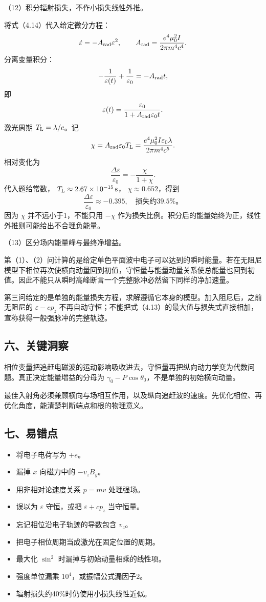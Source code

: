 \documentclass[12pt,a4paper,fontset=fandol]{ctexart}
\providecommand{\tightlist}{\setlength{\itemsep}{0pt}\setlength{\parskip}{0pt}}
\begin{document}
（12）积分辐射损失，不作小损失线性外推。

将式（4.14）代入给定微分方程： \[
\dot\varepsilon=-A_{\rm rad}\varepsilon^2,\qquad
A_{\rm rad}=\frac{e^4\mu_0^2I}{2\pi m^4c^4}.
\] 分离变量积分： \[
-\frac1{\varepsilon(t)}+\frac1{\varepsilon_0}
=-A_{\rm rad}t,
\] 即 \[
\varepsilon(t)=\frac{\varepsilon_0}
{1+A_{\rm rad}\varepsilon_0t}.
\] 激光周期 \(T_{\rm L}=\lambda/c\)。记 \[
\chi=A_{\rm rad}\varepsilon_0T_{\rm L}
=\frac{e^4\mu_0^2I\varepsilon_0\lambda}
{2\pi m^4c^5}.
\] 相对变化为 \[
\boxed{\frac{\Delta\varepsilon}{\varepsilon_0}
=-\frac{\chi}{1+\chi}.}\tag{4.15}
\] 代入题给常数， \(T_{\rm L}\approx2.67\times10^{-15}\,\mathrm s\)，
\(\chi\approx0.652\)，得到 \[
\boxed{\frac{\Delta\varepsilon}{\varepsilon_0}
\approx-0.395,\quad\text{损失约39.5\%。}}
\] 因为 \(\chi\) 并不远小于1，不能只用 \(-\chi\)
作为损失比例。积分后的能量始终为正，线性外推则可能给出不合理负能量。

（13）区分场内能量峰与最终净增益。

第（1）、（2）问计算的是给定单色平面波中电子可以达到的瞬时能量。若在无阻尼模型下相位再次使横向动量回到初值，守恒量与能量动量关系使总能量也回到初值。因此不能只从瞬时高峰断言一个完整脉冲必然留下同样的净加速量。

第三问给定的是单独的能量损失方程，求解遵循它本身的模型。加入阻尼后，之前无阻尼的
\(\varepsilon-cp_z\)
不再自动守恒；不能把式（4.13）的最大值与损失式直接相加，宣称获得一般强脉冲的完整轨迹。

\subsection{六、关键洞察}\label{ux516dux5173ux952eux6d1eux5bdf-3}

相位变量把追赶电磁波的运动影响吸收进去，守恒量再把纵向动力学变为代数问题。真正决定能量增益的分母为
\(\gamma_0-P\cos\theta_0\)，不是单独的初始横向动量。

最佳入射角必须兼顾横向与场相互作用，以及纵向追赶波的速度。先优化相位、再优化角度，能清楚判断端点和根的物理意义。

\subsection{七、易错点}\label{ux4e03ux6613ux9519ux70b9-3}

\begin{itemize}
\tightlist
\item
  将电子电荷写为 \(+e\)。
\item
  漏掉 \(x\) 向磁力中的 \(-v_zB_y\)。
\item
  用非相对论速度关系 \(p=mv\) 处理强场。
\item
  误以为 \(\varepsilon\) 守恒，或把 \(\varepsilon+cp_z\) 当守恒量。
\item
  忘记相位沿电子轨迹的导数包含 \(v_z\)。
\item
  把电子相位周期当成激光在固定位置的周期。
\item
  最大化 \(\sin^2\) 时漏掉与初始动量相乘的线性项。
\item
  强度单位漏乘 \(10^4\)，或振幅公式漏因子2。
\item
  辐射损失约40\%时仍使用小损失线性近似。
\end{itemize}
\end{document}
